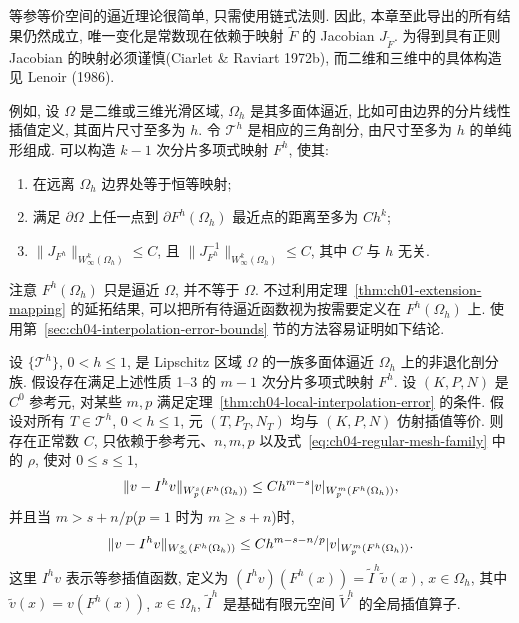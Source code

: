等参等价空间的逼近理论很简单, 只需使用链式法则. 因此, 本章至此导出的所有结果仍然成立, 唯一变化是常数现在依赖于映射 $\widetilde F$ 的 Jacobian $J_{\widetilde F}$. 为得到具有正则 Jacobian 的映射必须谨慎(Ciarlet \& Raviart 1972b), 而二维和三维中的具体构造见 Lenoir (1986).

例如, 设 $\Omega$ 是二维或三维光滑区域, $\Omega_h$ 是其多面体逼近, 比如可由边界的分片线性插值定义, 其面片尺寸至多为 $h$. 令 $\mathcal T^h$ 是相应的三角剖分, 由尺寸至多为 $h$ 的单纯形组成. 可以构造 $k-1$ 次分片多项式映射 $F^h$, 使其:
\begin{enumerate}
\item 在远离 $\Omega_h$ 边界处等于恒等映射;
\item 满足 $\partial\Omega$ 上任一点到 $\partial F^h(\Omega_h)$ 最近点的距离至多为 $Ch^k$;
\item $\|J_{F^h}\|_{W_\infty^k(\Omega_h)}\leq C$, 且 $\|J_{F^h}^{-1}\|_{W_\infty^k(\Omega_h)}\leq C$, 其中 $C$ 与 $h$ 无关.
\end{enumerate}
注意 $F^h(\Omega_h)$ 只是逼近 $\Omega$, 并不等于 $\Omega$. 不过利用定理~\ref{thm:ch01-extension-mapping} 的延拓结果, 可以把所有待逼近函数视为按需要定义在 $F^h(\Omega_h)$ 上. 使用第~\ref{sec:ch04-interpolation-error-bounds} 节的方法容易证明如下结论.

\setcounter{thmcount}{2}
\begin{Theorem}
\label{thm:ch04-isoparametric-interpolation-error}
设 $\{\mathcal T^h\}$, $0<h\leq1$, 是 Lipschitz 区域 $\Omega$ 的一族多面体逼近 $\Omega_h$ 上的非退化剖分族. 假设存在满足上述性质 1--3 的 $m-1$ 次分片多项式映射 $F^h$. 设 $(K,P,N)$ 是 $C^0$ 参考元, 对某些 $m,p$ 满足定理~\ref{thm:ch04-local-interpolation-error} 的条件. 假设对所有 $T\in\mathcal T^h$, $0<h\leq1$, 元 $(T,P_T,N_T)$ 均与 $(K,P,N)$ 仿射插值等价. 则存在正常数 $C$, 只依赖于参考元、$n,m,p$ 以及式~\eqref{eq:ch04-regular-mesh-family} 中的 $\rho$, 使对 $0\leq s\leq1$,
\begin{equation}
\MathBookFormulaID{formula-ch04-isoparametric-lp-error}
\label{eq:ch04-isoparametric-lp-error}
\|v-I^h v\|_{W_p^s(F^h(\Omega_h))}
\leq Ch^{m-s}|v|_{W_p^m(F^h(\Omega_h))},
\end{equation}
并且当 $m>s+n/p$($p=1$ 时为 $m\geq s+n$)时,
\begin{equation}
\MathBookFormulaID{formula-ch04-isoparametric-linfty-error}
\label{eq:ch04-isoparametric-linfty-error}
\|v-I^h v\|_{W_\infty^s(F^h(\Omega_h))}
\leq Ch^{m-s-n/p}|v|_{W_p^m(F^h(\Omega_h))}.
\end{equation}
这里 $I^h v$ 表示等参插值函数, 定义为 $(I^h v)(F^h(x))=\widetilde I^h\widetilde v(x)$, $x\in\Omega_h$, 其中 $\widetilde v(x)=v(F^h(x))$, $x\in\Omega_h$, $\widetilde I^h$ 是基础有限元空间 $\widetilde V^h$ 的全局插值算子.
\end{Theorem}

